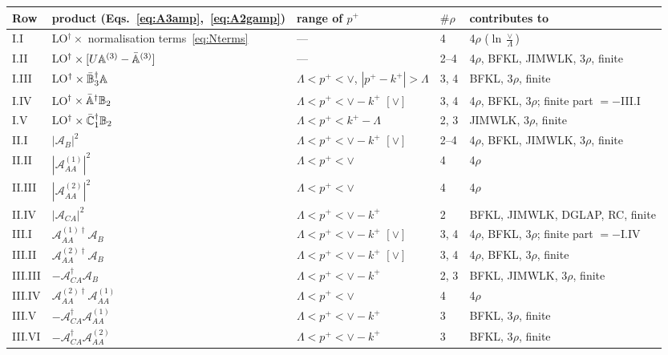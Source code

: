 \begin{table}[t]
\centering
\renewcommand{\arraystretch}{1.2}
\footnotesize
\begin{tabular}{@{}l p{4.0cm} p{2.9cm} l p{3.4cm}@{}}
\toprule
Row & product (Eqs.~\eqref{eq:A3amp},~\eqref{eq:A2gamp}) & range of $p^+$ & $\#\rho$ & contributes to\\
\midrule
I.I & LO$^\dagger\times$ normalisation terms~\eqref{eq:Nterms} & --- & 4 & 4$\rho$ ($\ln\frac{\vee}{\Lambda}$)\\
I.II & LO$^\dagger\times[U\mathbb{A}^{(3)}-\bar{\mathbb{A}}^{(3)}]$ & --- & 2--4 & 4$\rho$, BFKL, JIMWLK, 3$\rho$, finite\\
I.III & LO$^\dagger\times\bar{\mathbb{B}}_3^\dagger\mathbb{A}$ & $\Lambda<p^+<\vee$, $|p^+-k^+|>\Lambda$ & 3, 4 & BFKL, 3$\rho$, finite\\
I.IV & LO$^\dagger\times\bar{\mathbb{A}}^\dagger\mathbb{B}_2$ & $\Lambda<p^+<\vee-k^+$ $[\vee]$ & 3, 4 & 4$\rho$, BFKL, 3$\rho$; finite part $=-$III.I\\
I.V & LO$^\dagger\times\bar{\mathbb{C}}_1^\dagger\mathbb{B}_2$ & $\Lambda<p^+<k^+-\Lambda$ & 2, 3 & JIMWLK, 3$\rho$, finite\\
\midrule
II.I & $|\mathcal A_B|^2$ & $\Lambda<p^+<\vee-k^+$ $[\vee]$ & 2--4 & 4$\rho$, BFKL, JIMWLK, 3$\rho$, finite\\
II.II & $|\mathcal A^{(1)}_{AA}|^2$ & $\Lambda<p^+<\vee$ & 4 & 4$\rho$\\
II.III & $|\mathcal A^{(2)}_{AA}|^2$ & $\Lambda<p^+<\vee$ & 4 & 4$\rho$\\
II.IV & $|\mathcal A_{CA}|^2$ & $\Lambda<p^+<\vee-k^+$ & 2 & BFKL, JIMWLK, DGLAP, RC, finite\\
\midrule
III.I & $\mathcal A^{(1)\dagger}_{AA}\mathcal A_B$ & $\Lambda<p^+<\vee-k^+$ $[\vee]$ & 3, 4 & 4$\rho$, BFKL, 3$\rho$; finite part $=-$I.IV\\
III.II & $\mathcal A^{(2)\dagger}_{AA}\mathcal A_B$ & $\Lambda<p^+<\vee-k^+$ $[\vee]$ & 3, 4 & 4$\rho$, BFKL, 3$\rho$, finite\\
III.III & $-\mathcal A^{\dagger}_{CA}\mathcal A_B$ & $\Lambda<p^+<\vee-k^+$ & 2, 3 & BFKL, JIMWLK, 3$\rho$, finite\\
III.IV & $\mathcal A^{(2)\dagger}_{AA}\mathcal A^{(1)}_{AA}$ & $\Lambda<p^+<\vee$ & 4 & 4$\rho$\\
III.V & $-\mathcal A^{\dagger}_{CA}\mathcal A^{(1)}_{AA}$ & $\Lambda<p^+<\vee-k^+$ & 3 & BFKL, 3$\rho$, finite\\
III.VI & $-\mathcal A^{\dagger}_{CA}\mathcal A^{(2)}_{AA}$ & $\Lambda<p^+<\vee-k^+$ & 3 & BFKL, 3$\rho$, finite\\

\end{tabular}
\end{table}
